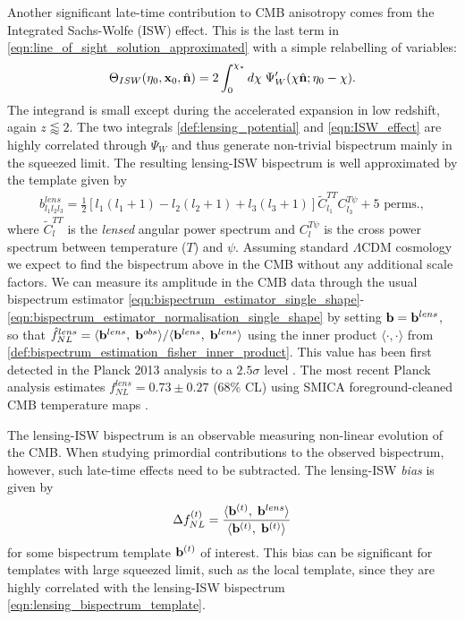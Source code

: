Another significant late-time contribution to CMB anisotropy comes from the Integrated Sachs-Wolfe (ISW) effect. This is the last term in \eqref{eqn:line_of_sight_solution_approximated} with a simple relabelling of variables:
\begin{align}
	\Theta_{ISW}(\eta_0,\mathbf{x}_0, \hat{\mathbf{n}}) = 2\int_0^{\chi_*} d\chi \; \Psi'_W (\chi\hat{\mathbf{n}}; \eta_0-\chi). \label{eqn:ISW_effect}
\end{align}
The integrand is small except during the accelerated expansion in low redshift, again $z\lessapprox2$. The two integrals \eqref{def:lensing_potential} and \eqref{eqn:ISW_effect} are highly correlated through $\Psi_W$ and thus generate non-trivial bispectrum mainly in the squeezed limit. The resulting lensing-ISW bispectrum is well approximated by the template given by \cite{Lewis2011lensing}
\begin{align}
	b^{lens}_{l_1 l_2 l_3} = \frac{1}{2}\left[ l_1 (l_1 + 1) - l_2 (l_2 + 1) + l_3 (l_3 + 1) \right] \tilde{C}_{l_1}^{TT} C_{l_3}^{T\psi} + \text{5 perms.}, \label{eqn:lensing_bispectrum_template}
\end{align}
where $\tilde{C}^{TT}_l$ is the \textit{lensed} angular power spectrum and $C^{T\psi}_l$ is the cross power spectrum between temperature ($T$) and $\psi$. Assuming standard $\Lambda$CDM cosmology we expect to find the bispectrum above in the CMB without any additional scale factors. We can measure its amplitude in the CMB data through the usual bispectrum estimator \eqref{eqn:bispectrum_estimator_single_shape}-\eqref{eqn:bispectrum_estimator_normalisation_single_shape} by setting $\mathbf{b} = \mathbf{b}^{lens}$, so that $\hat{f}^{lens}_{NL} = \langle \mathbf{b}^{lens}, \; \mathbf{b}^{obs} \rangle / \langle \mathbf{b}^{lens}, \; \mathbf{b}^{lens} \rangle$ using the inner product $\langle \cdot,\cdot \rangle$ from \eqref{def:bispectrum_estimation_fisher_inner_product}. This value has been first detected in the Planck 2013 analysis to a $2.5\sigma$ level \cite{PlanckCollaboration2013ISW}. The most recent Planck analysis estimates $f^{lens}_{NL} = 0.73 \pm 0.27$ (68\% CL) using SMICA foreground-cleaned CMB temperature maps \cite{PlanckCollaboration2018}.

The lensing-ISW bispectrum is an observable measuring non-linear evolution of the CMB. When studying primordial contributions to the observed bispectrum, however, such late-time effects need to be subtracted. The lensing-ISW \textit{bias} is given by
\begin{align}
	\Delta f_{NL}^{(t)} = \frac{ \langle \mathbf{b}^{(t)}, \; \mathbf{b}^{lens} \rangle }{ \langle \mathbf{b}^{(t)}, \; \mathbf{b}^{(t)} \rangle}
\end{align}
for some bispectrum template $\mathbf{b}^{(t)}$ of interest. This bias can be significant for templates with large squeezed limit, such as the local template, since they are highly correlated with the lensing-ISW bispectrum \eqref{eqn:lensing_bispectrum_template}.


